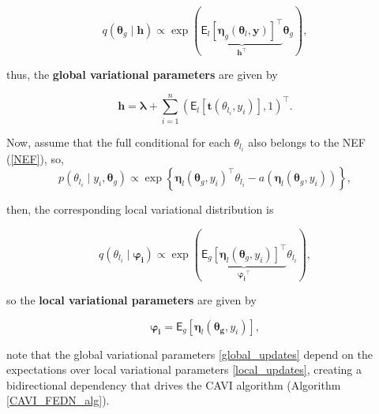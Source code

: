 \begin{equation}
q(\bm{\theta}_{g}\mid\bm{h})\propto\exp{(\underbrace{\mathsf{E}_{l}\left[\bm{\eta}_g(\bm{\theta}_l,\bm{y})\right]^\top}_{\bm{h}^\top}\bm{\theta}_{g})},
\end{equation}

thus, the \textbf{global variational parameters} are given by

\begin{equation}
\label{global_updates}
\bm{h}=\bm{\lambda}+\sum_{i=1}^{n}(\mathsf{E}_{l}\left[\bm{t}\left(\theta_{l_i},y_i\right)\right],1)^\top.
\end{equation}

\vspace{0.5cm}

Now, assume that the full conditional for each $\theta_{l_i}$ also belongs to the NEF (\ref{NEF}), so,
\begin{equation}
        p(\theta_{l_i}\mid y_i,\bm{\theta}_g)\propto\exp{\left\lbrace{\bm{\eta}_l(\bm{\theta}_g,y_i)}^\top\theta_{l_i}-a\left(\bm{\eta}_l(\bm{\theta}_g,y_i)\right)\right\rbrace},
\end{equation}

then, the corresponding local variational distribution is

\begin{equation}
q(\theta_{l_i}\mid\bm{\varphi_i})\propto\exp{(\underbrace{\mathsf{E}_{g}\left[\bm{\eta}_l(\bm{\theta}_g,y_i)\right]^\top}_{\bm{\varphi_i}^\top}\theta_{l_i})},
\end{equation}

so the \textbf{local variational parameters} are given by

\begin{equation}
    \label{local_updates}
\bm{\varphi_i}=\mathsf{E}_{g}\left[\bm{\eta}_l(\bm{\theta_g},y_i)\right],
\end{equation}

note that the global variational parameters \ref{global_updates} depend on the expectations over local variational parameters \ref{local_updates}, creating a bidirectional dependency that drives the \textsf{CAVI} algorithm (Algorithm \ref{CAVI_FEDN_alg}).

